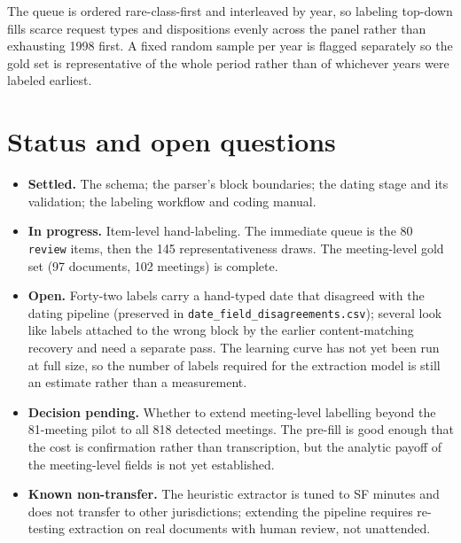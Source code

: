 \documentclass[11pt]{article}
\begin{document}
The queue is ordered rare-class-first and interleaved by year, so labeling top-down fills
scarce request types and dispositions evenly across the panel rather than exhausting 1998
first. A fixed random sample per year is flagged separately so the gold set is
representative of the whole period rather than of whichever years were labeled earliest.

\section{Status and open questions}

\begin{itemize}
\item \textbf{Settled.} The schema; the parser's block boundaries; the dating stage and its
validation; the labeling workflow and coding manual.
\item \textbf{In progress.} Item-level hand-labeling. The immediate queue is the 80
\texttt{review} items, then the 145 representativeness draws. The meeting-level gold set
(97 documents, 102 meetings) is complete.
\item \textbf{Open.} Forty-two labels carry a hand-typed date that disagreed with the
dating pipeline (preserved in \texttt{date\_field\_disagreements.csv}); several look like
labels attached to the wrong block by the earlier content-matching recovery and need a
separate pass. The learning curve has not yet been run at full size, so the number of
labels required for the extraction model is still an estimate rather than a measurement.
\item \textbf{Decision pending.} Whether to extend meeting-level labelling beyond the
81-meeting pilot to all 818 detected meetings. The pre-fill is good enough that the cost is
confirmation rather than transcription, but the analytic payoff of the meeting-level fields
is not yet established.
\item \textbf{Known non-transfer.} The heuristic extractor is tuned to SF minutes and does
not transfer to other jurisdictions; extending the pipeline requires re-testing extraction
on real documents with human review, not unattended.
\end{itemize}
\end{document}
